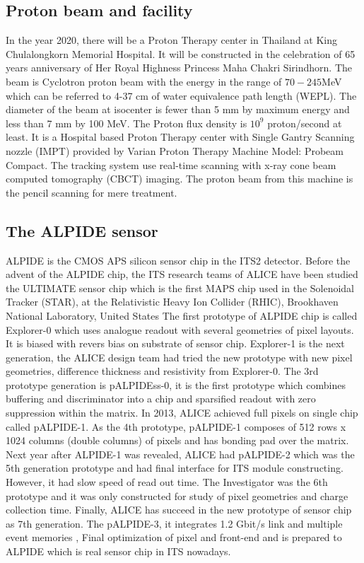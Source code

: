 \documentclass[12pt,a4paper]{article}
\begin{document}
\subsection{Proton beam and facility}

\indent In the year 2020, there will be a Proton Therapy center in Thailand at King Chulalongkorn Memorial Hospital. It will be constructed in the celebration of 65 years anniversary of Her Royal Highness Princess Maha Chakri Sirindhorn. The beam is Cyclotron proton beam with the energy in the range of $70-245 $MeV which can be referred to 4-37 cm of water equivalence path length (WEPL). The diameter of the beam at isocenter is fewer than 5 mm by maximum energy and less than 7 mm by 100 MeV. The Proton flux density is $10^9$ proton/second at least. It  is a Hospital based Proton Therapy center with Single Gantry Scanning nozzle (IMPT) provided by Varian Proton Therapy Machine Model: Probeam Compact. The tracking system use real-time scanning with x-ray cone beam computed tomography (CBCT) imaging. The proton beam from this machine is the pencil scanning for mere treatment.    

\subsection{The ALPIDE sensor}

\indent ALPIDE is the  CMOS APS silicon sensor chip in the ITS2 detector.  Before the advent of the  ALPIDE chip, the ITS research teams of ALICE have been studied  the ULTIMATE sensor chip which is the first MAPS chip used in the Solenoidal Tracker (STAR), at the Relativistic Heavy Ion Collider (RHIC), Brookhaven National Laboratory, United States  
The first prototype of ALPIDE chip is called Explorer-0 which uses analogue readout with several geometries of pixel layouts.
It  is biased with revers bias on substrate of sensor chip. Explorer-1 is the next generation, the ALICE design team had tried  the new prototype with new pixel geometries, difference thickness and resistivity from Explorer-0. 
The 3rd prototype generation is pALPIDEss-0, it is the first prototype which combines buffering and discriminator into a chip and sparsified readout with zero suppression within the matrix. In 2013, ALICE achieved full pixels on single chip  called pALPIDE-1. As the 4th prototype, pALPIDE-1 composes of 512 rows x 1024 columns (double columns) of pixels and has bonding pad over the matrix. Next year after ALPIDE-1 was revealed, ALICE had pALPIDE-2 which was the 5th generation prototype and had final interface for ITS module constructing.
However,  it had slow speed of read out time. The Investigator was the 6th prototype and it was only constructed for study of pixel geometries and charge collection time. Finally, ALICE has succeed in the new prototype of sensor chip as 7th generation. The pALPIDE-3, it integrates 1.2 Gbit/s link and multiple event memories \cite{vanHoorn:2119197}, Final optimization of pixel and front-end and is prepared to ALPIDE which is real sensor chip in ITS nowadays.
\end{document}
